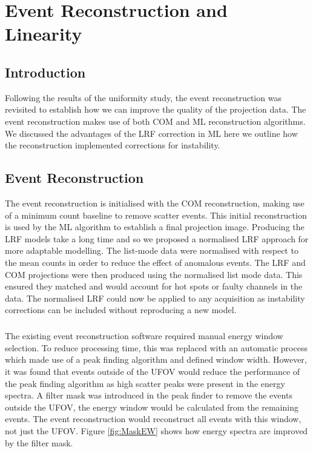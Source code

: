 \chapter{Event Reconstruction and Linearity}
\label{Linearity}

\section{Introduction}
Following the results of the uniformity study, the event reconstruction was revisited to establish how we can improve the quality of the projection data. The event reconstruction makes use of both \acrshort{COM} and \acrshort{ML} reconstruction algorithms. We discussed the advantages of the \acrshort{LRF} correction in \acrshort{ML} here we outline how the reconstruction implemented corrections for instability. 

\section{Event Reconstruction}
The event reconstruction is initialised with the \acrshort{COM} reconstruction, making use of a minimum count baseline to remove scatter events. This initial reconstruction is used by the \acrshort{ML} algorithm to establish a final projection image. Producing the \acrshort{LRF} models take a long time and so we proposed a normalised \acrshort{LRF} approach for more adaptable modelling. The list-mode data were normalised with respect to the mean counts in order to reduce the effect of anomalous events. The \acrshort{LRF} and \acrshort{COM} projections were then produced using the normalised list mode data. This ensured they matched and would account for hot spots or faulty channels in the data. The normalised \acrshort{LRF} could now be applied to any acquisition as instability corrections can be included without reproducing a new model.
\paragraph{}
The existing event reconstruction software required manual energy window selection. To reduce processing time, this was replaced with an automatic process which made use of a peak finding algorithm and defined window width. However, it was found that events outside of the \acrshort{UFOV} would reduce the performance of the peak finding algorithm as high scatter peaks were present in the energy spectra. A filter mask was introduced in the peak finder to remove the events outside the \acrshort{UFOV}, the energy window would be calculated from the remaining events. The event reconstruction would reconstruct all events with this window, not just the \acrshort{UFOV}. Figure \ref{fig:MaskEW} shows how energy spectra are improved by the filter mask. 

